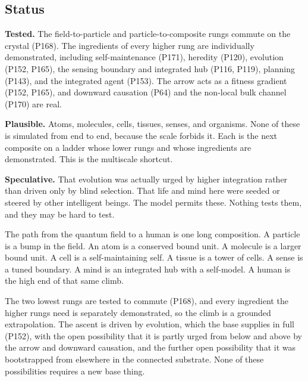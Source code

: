 \subsection{Status}

\textbf{Tested.} The field-to-particle and particle-to-composite rungs commute on the crystal (P168). The ingredients of every higher rung are individually demonstrated, including self-maintenance (P171), heredity (P120), evolution (P152, P165), the sensing boundary and integrated hub (P116, P119), planning (P143), and the integrated agent (P153). The arrow acts as a fitness gradient (P152, P165), and downward causation (P64) and the non-local bulk channel (P170) are real.

\textbf{Plausible.} Atoms, molecules, cells, tissues, senses, and organisms. None of these is simulated from end to end, because the scale forbids it. Each is the next composite on a ladder whose lower rungs and whose ingredients are demonstrated. This is the multiscale shortcut.

\textbf{Speculative.} That evolution was actually urged by higher integration rather than driven only by blind selection. That life and mind here were seeded or steered by other intelligent beings. The model permits these. Nothing tests them, and they may be hard to test.

The path from the quantum field to a human is one long composition. A particle is a bump in the field. An atom is a conserved bound unit. A molecule is a larger bound unit. A cell is a self-maintaining self. A tissue is a tower of cells. A sense is a tuned boundary. A mind is an integrated hub with a self-model. A human is the high end of that same climb.

The two lowest rungs are tested to commute (P168), and every ingredient the higher rungs need is separately demonstrated, so the climb is a grounded extrapolation. The ascent is driven by evolution, which the base supplies in full (P152), with the open possibility that it is partly urged from below and above by the arrow and downward causation, and the further open possibility that it was bootstrapped from elsewhere in the connected substrate. None of these possibilities requires a new base thing.
